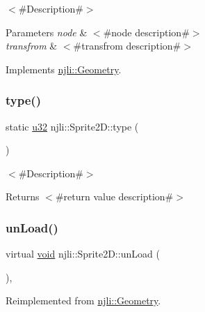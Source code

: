$<$\#\+Description\#$>$


\begin{DoxyParams}{Parameters}
{\em node} & $<$\#node description\#$>$ \\
\hline
{\em transfrom} & $<$\#transfrom description\#$>$ \\
\hline
\end{DoxyParams}


Implements \mbox{\hyperlink{classnjli_1_1_geometry_a25fefe3f656bdcb8c88d2fd4d2f48df1}{njli\+::\+Geometry}}.

\mbox{\label{classnjli_1_1_sprite2_d_a2a55a0a9a9d32af30b6bf0c7f52d146e}} 
\subsubsection{\texorpdfstring{type()}{type()}}
{\footnotesize\ttfamily static \mbox{\hyperlink{_util_8h_a10e94b422ef0c20dcdec20d31a1f5049}{u32}} njli\+::\+Sprite2\+D\+::type (\begin{DoxyParamCaption}{ }\end{DoxyParamCaption})\hspace{0.3cm}{\ttfamily [static]}}

$<$\#\+Description\#$>$

\begin{DoxyReturn}{Returns}
$<$\#return value description\#$>$ 
\end{DoxyReturn}
\mbox{\label{classnjli_1_1_sprite2_d_a7d6d0369dd3cd6552d3a188aa323a088}} 
\subsubsection{\texorpdfstring{un\+Load()}{unLoad()}}
{\footnotesize\ttfamily virtual \mbox{\hyperlink{_thread_8h_af1e856da2e658414cb2456cb6f7ebc66}{void}} njli\+::\+Sprite2\+D\+::un\+Load (\begin{DoxyParamCaption}{ }\end{DoxyParamCaption})\hspace{0.3cm}{\ttfamily [protected]}, {\ttfamily [virtual]}}



Reimplemented from \mbox{\hyperlink{classnjli_1_1_geometry_a0c5960113b3cd040e7df7b8d2104f7a3}{njli\+::\+Geometry}}.



